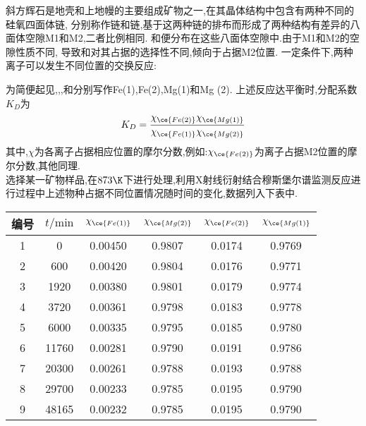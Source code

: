 \documentclass{ctexart}
\begin{document}
\begin{problem}
    斜方辉石\ce{[(Mg,Fe)2Si2O6]}是地壳和上地幔的主要组成矿物之一,在其晶体结构中包含有两种不同的硅氧四面体链,%
    分别称作链和链,基于这两种链的排布而形成了两种结构有差异的八面体空隙M1和M2,二者比例相同.%
    和便分布在这些八面体空隙中.由于M1和M2的空隙性质不同,%
    导致和对其占据的选择性不同,倾向于占据M2位置.%
    一定条件下,两种离子可以发生不同位置的交换反应:
    \begin{tightcenter}
    \end{tightcenter}
    为简便起见,,,和分别写作Fe(1),Fe(2),Mg(1)和Mg (2).%
    上述反应达平衡时,分配系数$K_D$为
    \[K_D=\dfrac{\chi_{\ce{Fe(2)}}\chi_{\ce{Mg(1)}}}{\chi_{\ce{Fe(1)}}\chi_{\ce{Mg(2)}}}\]
    其中,$\chi$为各离子占据相应位置的摩尔分数,例如:$\chi_{\ce{Fe(2)}}$为离子占据M2位置的摩尔分数,其他同理.\\
    选择某一矿物样品,在$873\K$下进行处理,利用X射线衍射结合穆斯堡尔谱监测反应进行过程中上述物种占据不同位置情况随时间的变化,数据列入下表中.
    \vspace{-5pt}\begin{table}[H]\centering
        \begin{tabular}{|c|c|c|c|c|c|}
            \hline
                编号 & $t/\text{min}$ & $\chi_{\ce{Fe(1)}}$ & $\chi_{\ce{Mg(2)}}$ & $\chi_{\ce{Fe(2)}}$ & $\chi_{\ce{Mg(1)}}$ \\ \hline
                1   & 0     & 0.00450   & 0.9807    & 0.0174    & 0.9769 \\ \hline
                2	& 600   & 0.00420   & 0.9804    & 0.0176    & 0.9771 \\ \hline
                3	& 1920  & 0.00380   & 0.9801	& 0.0179	& 0.9774 \\ \hline
                4	& 3720	& 0.00361	& 0.9798	& 0.0183	& 0.9778 \\ \hline
                5	& 6000	& 0.00335	& 0.9795	& 0.0185	& 0.9780 \\ \hline
                6	& 11760	& 0.00281	& 0.9790	& 0.0191	& 0.9786 \\ \hline
                7	& 20300	& 0.00261	& 0.9788	& 0.0193	& 0.9788 \\ \hline
                8	& 29700	& 0.00233	& 0.9785	& 0.0195	& 0.9790 \\ \hline
                9	& 48165	& 0.00232	& 0.9785	& 0.0195	& 0.9790 \\ \hline

\end{tabular}
\end{table}
\end{problem}
\end{document}
